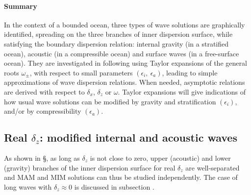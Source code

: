 \paragraph{Summary}
In the context of a bounded ocean, three types of wave solutions are graphically identified, spreading on the three branches of inner dispersion surface, while satisfying the boundary dispersion relation: internal gravity (in a stratified ocean), acoustic (in a compressible ocean) and surface waves (in a free-surface ocean). They are investigated in following using Taylor expansions of the general roots $\omega_{\pm}$, with respect to small parameters $(\epsilon_i,\ \epsilon_a)$, leading to simple approximations of wave dispersion relations. When needed, asymptotic relations are derived with respect to $\delta_x$, $\delta_z$ or $\omega$. Taylor expansions will give indications of how usual wave solutions can be modified by gravity and stratification $(\epsilon_i)$, and/or by compressibility $(\epsilon_a)$.
\subsection{Real $\delta_z$: modified internal and acoustic waves}
As shown in \S{}, as long as $\delta_z$ is not close to zero, upper (acoustic) and lower (gravity) branches of the inner dispersion surface for real $\delta_z$ are well-separated and MAM and MIM solutions can thus be studied independently. The case of long waves with $\delta_z \approx 0$ is discussed in subsection .
%
